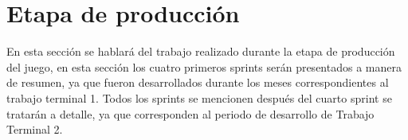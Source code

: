 \section{Etapa de producción}
En esta sección se hablará del trabajo realizado durante la etapa de producción 
del juego, en esta sección los cuatro primeros sprints serán presentados a manera 
de resumen, ya que fueron desarrollados durante los meses correspondientes al 
trabajo terminal 1. Todos los sprints se mencionen después del cuarto sprint se 
tratarán a detalle, ya que corresponden al periodo de desarrollo de Trabajo Terminal 2.




